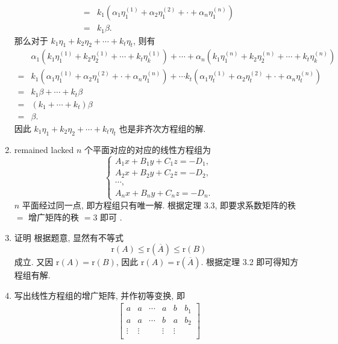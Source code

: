\documentclass[a4paper, 11pt]{ctexart}
\newcommand{\rank}{\mathrm{r}}
\begin{document}
\begin{enumerate}
\begin{align*}
            ={} & k_1(\alpha_1\eta_1^{(1)} + \alpha_2\eta_1^{(2)} + \cdot + \alpha_n\eta_1^{(n)}) \\
            ={} & k_1\beta.    
        \end{align*}
        那么对于 $k_1\eta_1 + k_2\eta_2 + \cdots + k_t\eta_t$, 则有
        \begin{align*}
            & \alpha_1(k_1\eta_1^{(1)} + k_2\eta_2^{(1)} + \cdots + k_t\eta_k^{(1)}) + \cdots + \alpha_n(k_1\eta_1^{(n)} + k_2\eta_2^{(n)} + \cdots + k_t\eta_k^{(n)}) \\
            ={} & k_1(\alpha_1\eta_1^{(1)} + \alpha_2\eta_1^{(2)} + \cdot + \alpha_n\eta_1^{(n)}) + \cdots k_t(\alpha_1\eta_t^{(1)} + \alpha_2\eta_t^{(2)} + \cdot + \alpha_n\eta_t^{(n)}) \\
            ={} & k_1\beta + \cdots + k_t\beta \\
            ={} & (k_1 + \cdots + k_t)\beta \\
            ={} & \beta.
        \end{align*}
        因此 $k_1\eta_1 + k_2\eta_2 + \cdots + k_t\eta_t$ 也是非齐次方程组的解.
    \item %
        {\color{red} remained lacked}
        $n$ 个平面对应的对应的线性方程组为
        \[
            \begin{cases}
                A_1x + B_1y + C_1z = -D_1, \\
                A_2x + B_2y + C_2z = -D_2, \\
                \cdots, \\
                A_nx + B_ny + C_nz = -D_n.
            \end{cases}
        \]
        $n$ 平面经过同一点, 即方程组只有唯一解. 根据定理 3.3, 即要求系数矩阵的秩 $=$ 增广矩阵的秩 $= 3$ 即可 .
    \item %
        {\heiti 证明} 根据题意, 显然有不等式
        \[
            \rank(A) \leqslant \rank(\overline{A}) \leqslant \rank(B)    
        \]
        成立. 又因 $\rank(A) = \rank(B)$, 因此 $\rank(A) = \rank(\overline{A})$. 根据定理 3.2 即可得知方程组有解.
    \item %
        写出线性方程组的增广矩阵, 并作初等变换, 即
        \begin{gather*}
            \begin{bmatrix}
                a & a & \cdots & a & b & b_1 \\
                a & a & \cdots & b & a & b_2 \\
                \vdots & \vdots &  & \vdots & \vdots \\

\end{bmatrix}
\end{gather*}
\end{enumerate}
\end{document}
